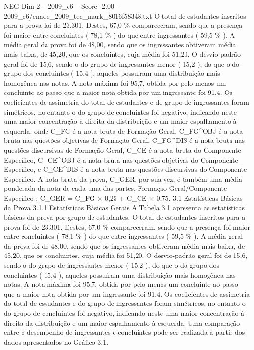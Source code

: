 \begin{textsample}{NEG Dim 2 – 2009\_c6 – Score -2.00 – 2009\_c6/enade\_2009\_tec\_mark\_8016f58348.txt}
O total de estudantes inscritos para a prova foi de 23.301.
Destes, 67,0 \% compareceram, sendo que a presença foi maior entre concluintes ( 78,1 \% ) do que entre ingressantes ( 59,5 \% ).
A média geral da prova foi de 48,00, sendo que os ingressantes obtiveram média mais baixa, de 45,20, que os concluintes, cuja média foi 51,20.
O desvio-padrão geral foi de 15,6, sendo o do grupo de ingressantes menor ( 15,2 ), do que o do grupo dos concluintes ( 15,4 ), aqueles possuíram uma distribuição mais homogênea nas notas.
A nota máxima foi 95,7, obtida por pelo menos um concluinte ao passo que a maior nota obtida por um ingressante foi 91,4.
Os coeficientes de assimetria do total de estudantes e do grupo de ingressantes foram simétricos, no entanto o do grupo de concluintes foi negativo, indicando neste uma maior concentração à direita da distribuição e um maior espalhamento à esquerda. onde C\_FG é a nota bruta de Formação Geral, C\_FG\textasciicircum{}OBJ é a nota bruta nas questões objetivas de Formação Geral, C\_FG\textasciicircum{}DIS é a nota bruta nas questões discursivas de Formação Geral, C\_CE é a nota bruta do Componente Específico, C\_CE\textasciicircum{}OBJ é a nota bruta nas questões objetivas do Componente Específico, e C\_CE\textasciicircum{}DIS é a nota bruta nas questões discursivas do Componente Específico.
A nota bruta da prova, C\_GER, por sua vez, é também uma média ponderada da nota de cada uma das partes, Formação Geral/Componente Específico : C\_GER = C\_FG × 0,25 + C\_CE × 0,75. 3.1 Estatísticas Básicas da Prova 3.1.1 Estatísticas Básicas Gerais A Tabela 3.1 apresenta as estatísticas básicas da prova por grupo de estudantes.
O total de estudantes inscritos para a prova foi de 23.301.
Destes, 67,0 \% compareceram, sendo que a presença foi maior entre concluintes ( 78,1 \% ) do que entre ingressantes ( 59,5 \% ).
A média geral da prova foi de 48,00, sendo que os ingressantes obtiveram média mais baixa, de 45,20, que os concluintes, cuja média foi 51,20.
O desvio-padrão geral foi de 15,6, sendo o do grupo de ingressantes menor ( 15,2 ), do que o do grupo dos concluintes ( 15,4 ), aqueles possuíram uma distribuição mais homogênea nas notas.
A nota máxima foi 95,7, obtida por pelo menos um concluinte ao passo que a maior nota obtida por um ingressante foi 91,4.
Os coeficientes de assimetria do total de estudantes e do grupo de ingressantes foram simétricos, no entanto o do grupo de concluintes foi negativo, indicando neste uma maior concentração à direita da distribuição e um maior espalhamento à esquerda.
Uma comparação entre o desempenho de ingressantes e concluintes pode ser realizada a partir dos dados apresentados no Gráfico 3.1.

\end{textsample}
